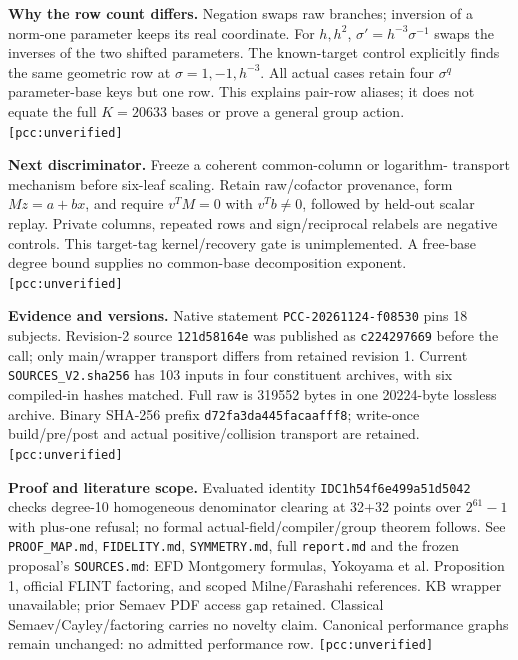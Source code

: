 \documentclass[10pt]{article}
\newcommand{\uv}{\texttt{[pcc:unverified]}}
\begin{document}
\textbf{Why the row count differs.} Negation swaps raw branches; inversion of
a norm-one parameter keeps its real coordinate. For $h,h^2$,
$\sigma'=h^{-3}\sigma^{-1}$ swaps the inverses of the two shifted parameters.
The known-target control explicitly finds the same geometric row at
$\sigma=1,-1,h^{-3}$. All actual cases retain four $\sigma^q$ parameter-base
keys but one row. This explains pair-row aliases; it does not equate the full
$K=20633$ bases or prove a general group action. \uv

\textbf{Next discriminator.} Freeze a coherent common-column or logarithm-
transport mechanism before six-leaf scaling. Retain raw/cofactor provenance,
form $Mz=a+bx$, and require $v^TM=0$ with $v^Tb\ne0$, followed by held-out scalar
replay. Private columns, repeated rows and sign/reciprocal relabels are negative
controls. This target-tag kernel/recovery gate is unimplemented. A free-base
degree bound supplies no common-base decomposition exponent. \uv

\textbf{Evidence and versions.} Native statement
\texttt{PCC-20261124-f08530} pins 18 subjects. Revision-2 source
\texttt{121d58164e} was published as \texttt{c224297669} before the call;
only main/wrapper transport differs from retained revision 1. Current
\texttt{SOURCES\_V2.sha256} has 103 inputs in four constituent archives,
with six compiled-in hashes matched. Full raw is 319552 bytes in one 20224-byte
lossless archive. Binary SHA-256 prefix \texttt{d72fa3da445facaafff8}; write-once
build/pre/post and actual positive/collision transport are retained. \uv

\textbf{Proof and literature scope.} Evaluated identity
\texttt{IDC1h54f6e499a51d5042} checks degree-10 homogeneous denominator
clearing at 32+32 points over $2^{61}-1$ with plus-one refusal; no formal
actual-field/compiler/group theorem follows. See \texttt{PROOF\_MAP.md},
\texttt{FIDELITY.md}, \texttt{SYMMETRY.md}, full \texttt{report.md} and
the frozen proposal's \texttt{SOURCES.md}: EFD Montgomery formulas,
Yokoyama et al. Proposition 1, official FLINT factoring, and scoped
Milne/Farashahi references. KB wrapper unavailable; prior Semaev PDF access
gap retained. Classical Semaev/Cayley/factoring carries no novelty claim.
Canonical performance graphs remain unchanged: no admitted performance row. \uv
\end{document}
